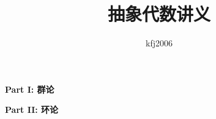 \documentclass[11pt,a4paper,openany]{book}
\title{抽象代数讲义}
\author{kfj2006}
\begin{document}
\tableofcontents
\clearpage

\mainmatter
\clearpage
\thispagestyle{empty}
\begin{center}
\vspace*{\fill}
{\fontsize{40}{52}\selectfont \bfseries Part I: 群论}
\vspace*{\fill}
\end{center}
\clearpage

\setcounter{chapter}{0}






\clearpage
\thispagestyle{empty}
\begin{center}
\vspace*{\fill}
{\fontsize{40}{52}\selectfont \bfseries Part II: 环论}
\vspace*{\fill}
\end{center}
\clearpage



\end{document}
